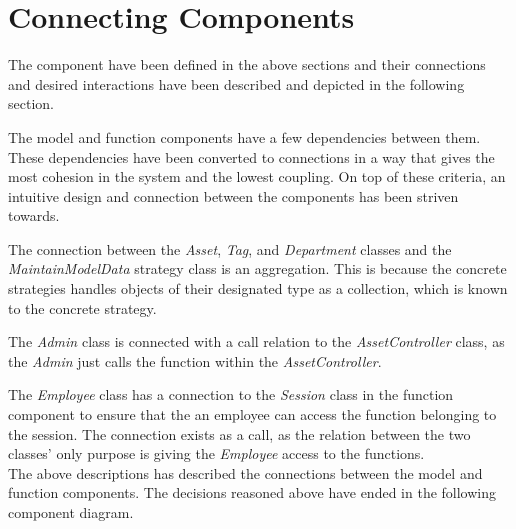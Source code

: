 \section{Connecting Components} \label{sc:connecting_components}
The component have been defined in the above sections and their connections and desired interactions have been described and depicted in the following section.
\par
The model and function components have a few dependencies between them. These dependencies have been converted to connections in a way that gives the most cohesion in the system and the lowest coupling. On top of these criteria, an intuitive design and connection between the components has been striven towards.
\par
The connection between the \textit{Asset}, \textit{Tag}, and \textit{Department} classes and the \textit{MaintainModelData} strategy class is an aggregation. This is because the concrete strategies handles objects of their designated type as a collection, which is known to the concrete strategy.
\par
The \textit{Admin} class is connected with a call relation to the \textit{AssetController} class, as the \textit{Admin} just calls the function within the \textit{AssetController}.
\par
The \textit{Employee} class has a connection to the \textit{Session} class in the function component to ensure that the an employee can access the function belonging to the session. The connection exists as a call, as the relation between the two classes' only purpose is giving the \textit{Employee} access to the functions.\\

The above descriptions has described the connections between the model and function components. The decisions reasoned above have ended in the following component diagram.